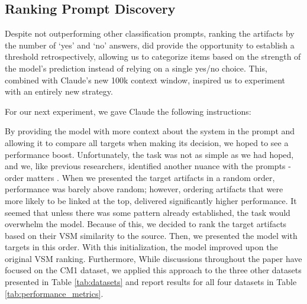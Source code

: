 \subsection{Ranking Prompt Discovery}
Despite not outperforming other classification prompts, ranking the artifacts by the number of `yes' and `no' answers, did provide the opportunity to establish a threshold retrospectively, allowing us to categorize items based on the strength of the model's prediction instead of relying on a single yes/no choice. This, combined with Claude's new 100k context window, inspired us to experiment with an entirely new strategy.

For our next experiment, we gave Claude the following instructions:



By providing the model with more context about the system in the prompt and allowing it to compare all targets when making its decision, we hoped to see a performance boost. Unfortunately, the task was not as simple as we had hoped, and we, like previous researchers, identified another nuance with the prompts - order matters \cite{qin_large_2023}. When we presented the target artifacts in a random order, performance was barely above random; however, ordering artifacts that were more likely to be linked at the top, delivered significantly higher performance. It seemed that unless there was some pattern already established, the task would overwhelm the model. Because of this, we decided to rank the target artifacts based on their VSM similarity to the source. Then, we presented the model with targets in this order. With this initialization, the model improved upon the original VSM ranking.  Furthermore, While discussions throughout the paper have focused on the CM1 dataset, we applied this approach to the three other datasets presented in Table \ref{tab:datasets} and report results for all four datasets in Table \ref{tab:performance_metrics}.

